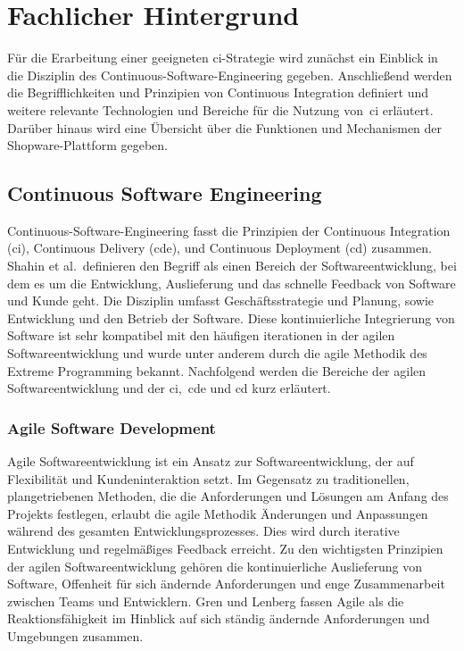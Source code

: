 
\section{Fachlicher Hintergrund} \label{sec:02-background}

Für die Erarbeitung einer geeigneten \acrshort{ci}-Strategie wird zunächst ein Einblick in die Disziplin des
Continuous-Software-Engineering gegeben.
Anschließend werden die Begrifflichkeiten und Prinzipien von Continuous Integration definiert und weitere
relevante Technologien und Bereiche für die Nutzung von\ \acrshort{ci} erläutert.
Darüber hinaus wird eine Übersicht über die Funktionen und Mechanismen der Shopware-Plattform gegeben.

\subsection{Continuous Software Engineering} \label{subsec:02-background-1}

Continuous-Software-Engineering fasst die Prinzipien der Continuous Integration (\acrshort{ci}),
Continuous Delivery (\acrshort{cde}), und Continuous Deployment (\acrshort{cd}) zusammen.
Shahin et al.\ definieren den Begriff als einen Bereich der Softwareentwicklung, bei dem es um die Entwicklung,
Auslieferung und das schnelle Feedback von Software und Kunde geht.
Die Disziplin umfasst Geschäftsstrategie und Planung, sowie Entwicklung und den Betrieb der Software.
Diese kontinuierliche Integrierung von Software ist sehr kompatibel mit den häufigen iterationen in der agilen
Softwareentwicklung und wurde unter anderem durch die agile Methodik des Extreme Programming bekannt.
Nachfolgend werden die Bereiche der agilen Softwareentwicklung und der \acrshort{ci},\ \acrshort{cde} und \acrshort{cd}
kurz erläutert.

\subsubsection{Agile Software Development}

Agile Softwareentwicklung ist ein Ansatz zur Softwareentwicklung, der auf Flexibilität und Kundeninteraktion setzt.
Im Gegensatz zu traditionellen, plangetriebenen Methoden, die die Anforderungen und Lösungen am Anfang des Projekts
festlegen, erlaubt die agile Methodik Änderungen und Anpassungen während des gesamten Entwicklungsprozesses.
Dies wird durch iterative Entwicklung und regelmäßiges Feedback erreicht.
Zu den wichtigsten Prinzipien der agilen Softwareentwicklung gehören die kontinuierliche Auslieferung von Software,
Offenheit für sich ändernde Anforderungen und enge Zusammenarbeit zwischen Teams und Entwicklern.
Gren und Lenberg fassen Agile als die Reaktionsfähigkeit im Hinblick auf sich ständig ändernde Anforderungen
und Umgebungen zusammen.

